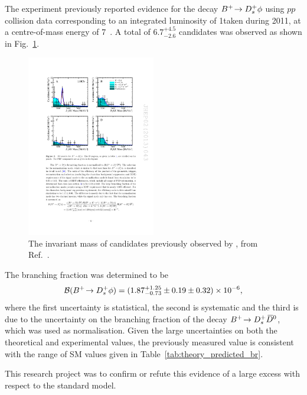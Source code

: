 The \lhcb experiment previously reported evidence for the decay ${{{B}^+}}\!\rightarrow {\ensuremath{{D}^+_{s}}}\phi$ using $pp$ collision data corresponding to an integrated luminosity of 1\invfb taken during 2011, at a centre-of-mass energy of 7\tev~\cite{LHCb-PAPER-2012-025}. A total of $6.7^{+4.5}_{-2.6}$ candidates was observed as shown in Fig.~\ref{fig:Theory_prev_B2DsPhi}. 
\begin{figure}[!h]
    \centering
    \includegraphics[width=0.5\textwidth]{figs/Theory/Prev_B2DsPhi.pdf}
    \caption{The invariant mass of \decay{\Bp}{\Dsp\phiz} candidates previously observed by \lhcb, from Ref.~\cite{LHCb-PAPER-2012-025}. }
    \label{fig:Theory_prev_B2DsPhi}   
\end{figure}
The branching fraction was determined to be 
\begin{equation}
\mathcal{B}({{{B}^+}}\!\rightarrow {\ensuremath{{D}^+_{s}}}\phi) = (1.87^{+1.25}_{-0.73} \pm 0.19 \pm 0.32) \times 10^{-6},
\end{equation}
where the first uncertainty is statistical, the second is systematic and the third is due to the uncertainty on the branching fraction of the decay ${{{B}^+}}\!\rightarrow {\ensuremath{{D}^+_{s}}}{\ensuremath{{\kern 0.2em\overline{\kern -0.2em D}{}}{}^0}}$, which was used as normalisation. 
Given the large uncertainties on both the theoretical and experimental values, the previously measured value is consistent with the range of SM values given in Table~\ref{tab:theory_predicted_br}.

This research project was to confirm or refute this evidence of a large excess with respect to the standard model.



